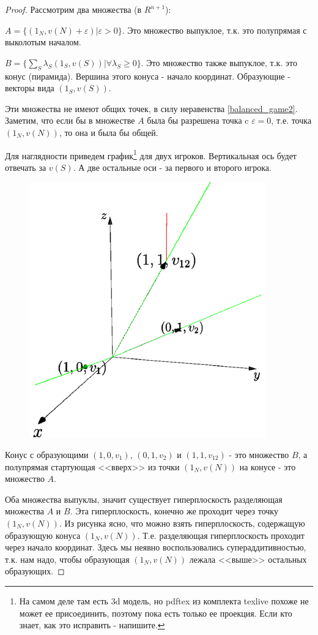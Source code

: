 \begin{proof}
Рассмотрим два множества (в $R^{n+1}$):

$A=\{(1_{N},v(N)+\varepsilon)| \varepsilon>0\}$. Это множество выпуклое, т.к. это полупрямая с выколотым началом.

$B=\{\sum_{S} \lambda_{S} (1_{S},v(S)) | \forall  \lambda_{S}\geq 0 \}$. Это множество также выпуклое, т.к. это конус (пирамида). Вершина этого конуса - начало координат. Образующие - векторы вида $(1_{S},v(S))$.


Эти множества не имеют общих точек, в силу неравенства \ref{balanced_game2}. Заметим, что если бы в множестве $A$ была бы разрешена точка c $\varepsilon=0$, т.е. точка $(1_{N},v(N))$, то она и была бы общей.

Для наглядности приведем график\footnote{На самом деле там есть 3d модель, но pdftex из комплекта texlive похоже не может ее присоединить, поэтому пока есть только ее проекция. Если кто знает, как это исправить - напишите.} для двух игроков. Вертикальная ось будет отвечать за $v(S)$. А две остальные оси - за первого и второго игрока. 

\begin{figure}[htbp]
	\includegraphics{coop_bondar.pdf}
\end{figure}

Конус с образующими $(1,0,v_{1})$, $(0,1,v_{2})$ и $(1,1,v_{12})$ - это множество $B$, а полупрямая стартующая <<вверх>> из точки $(1_{N},v(N))$ на конусе - это множество $A$. 

 Оба множества выпуклы, значит существует гиперплоскость разделяющая множества $A$ и $B$. Эта гиперплоскость, конечно же проходит через точку $(1_{N},v(N))$. Из рисунка ясно, что можно взять гиперплоскость, содержащую образующую конуса $(1_{N},v(N))$. Т.е. разделяющая гиперплоскость проходит через начало координат. Здесь мы неявно воспользовались супераддитивностью, т.к. нам надо, чтобы образующая $(1_{N},v(N))$ лежала <<выше>> остальных образующих.



\end{proof}
